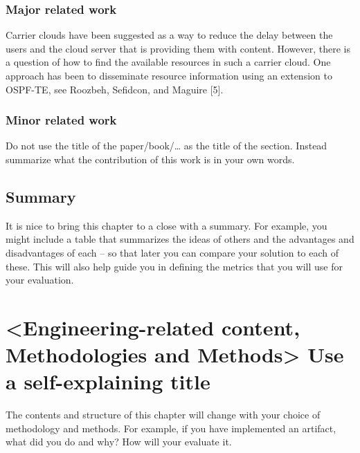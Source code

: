 \documentclass[a4paper,12pt,twocolumn]{article}
\numberwithin{figure}{section}
\numberwithin{table}{section}
\begin{document}
\subsubsection{Major related work}
Carrier clouds have been suggested as a way to reduce the delay between the users and the cloud
server that is providing them with content. However, there is a question of how to find the available
resources in such a carrier cloud. One approach has been to disseminate resource information using
an extension to OSPF-TE, see Roozbeh, Sefidcon, and Maguire [5].

\subsubsection{Minor related work}
Do not use the title of the paper/book/… as the title of the section. Instead summarize what the contribution of this work is in your own words.

\subsection{Summary}
It is nice to bring this chapter to a close with a summary. For example, you might include a table that summarizes the ideas of others and the advantages and disadvantages of each – so that later you can compare your solution to each of these. This will also help guide you in defining the metrics that you will use for your evaluation.


\section{<Engineering-related content, Methodologies and Methods>
Use a self-explaining title}

The contents and structure of this chapter will change with your choice of methodology and methods.
For example, if you have implemented an artifact, what did you do and why? How will your evaluate it.
\end{document}
